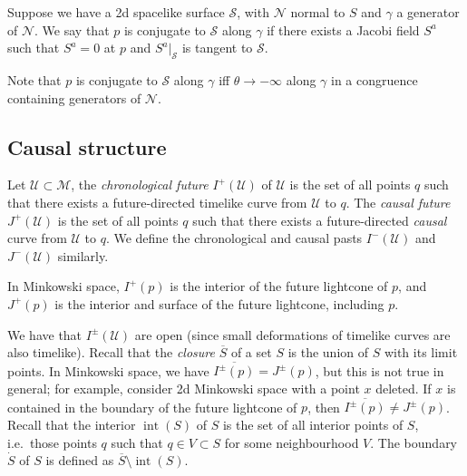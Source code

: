 \documentclass{jknotes}
\begin{document}
\begin{defn}
    Suppose we have a 2d spacelike surface \(\mathcal{S}\), with \(\mathcal{N}\) normal to \(S\) and \(\gamma\) a generator of \(\mathcal{N}\). We say that \(p\) is conjugate to \(\mathcal{S}\) along \(\gamma\) if there exists a Jacobi field \(S^a\) such that \(S^a=0\) at \(p\) and \(S^a|_{\mathcal{S}}\) is tangent to \(\mathcal{S}\).
\end{defn}

Note that \(p\) is conjugate to \(\mathcal{S}\) along \(\gamma\) iff \(\theta\to-\infty\) along \(\gamma\) in a congruence containing generators of \(\mathcal{N}\).

\subsection{Causal structure}
\begin{defn}
    Let \(\mathcal{U}\subset \mathcal{M}\), the \emph{chronological future} \(I^+(\mathcal{U})\) of \(\mathcal{U}\) is the set of all points \(q\) such that there exists a future-directed timelike curve from \(\mathcal{U}\) to \(q\). The \emph{causal future} \(J^+(\mathcal{U})\) is the set of all points \(q\) such that there exists a future-directed \emph{causal} curve from \(\mathcal{U}\) to \(q\). We define the chronological and causal pasts \(I^-(\mathcal{U})\) and \(J^-(\mathcal{U})\) similarly.
\end{defn}
\begin{eg}
    In Minkowski space, \(I^+(p)\) is the interior of the future lightcone of \(p\), and \(J^+(p)\) is the interior and surface of the future lightcone, including \(p\).
\end{eg}

We have that \(I^\pm(\mathcal{U})\) are open (since small deformations of timelike curves are also timelike). Recall that the \emph{closure} \(\overline{S}\) of a set \(S\) is the union of \(S\) with its limit points. In Minkowski space, we have \(\overline{I^\pm(p)} = J^\pm(p)\), but this is not true in general; for example, consider 2d Minkowski space with a point \(x\) deleted. If \(x\) is contained in the boundary of the future lightcone of \(p\), then \(\overline{I^\pm(p)} \ne J^\pm(p)\). Recall that the interior \(\operatorname{int}(S)\) of \(S\) is the set of all interior points of \(S\), i.e.\ those points \(q\) such that \(q\in V\subset S\) for some neighbourhood \(V\). The boundary \(\dot{S}\) of \(S\) is defined as \(\overline{S}\setminus\operatorname{int}(S)\).
\end{document}
